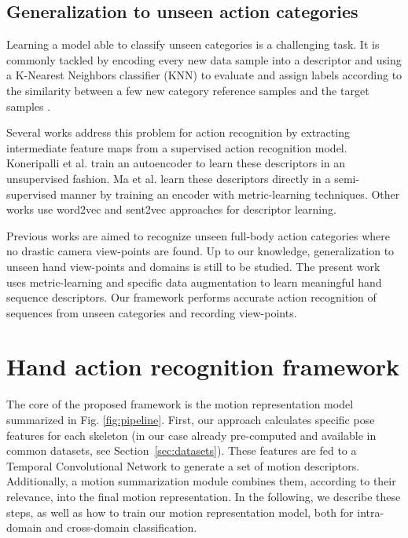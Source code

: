 \documentclass[letterpaper, 10 pt, conference]{ieeeconf}
\begin{document}
\subsection{Generalization to unseen action categories}

Learning a model able to classify unseen categories is a challenging task. It is commonly tackled by encoding every new data sample into a descriptor and using a K-Nearest Neighbors classifier (KNN) to evaluate and assign labels according to the similarity between a few new category reference samples and the target samples \cite{wang2019simpleshot}.


Several works \cite{liu2019ntu,sabater2021oneshot} address this problem for action recognition by extracting intermediate feature maps from a supervised action recognition model.
Koneripalli et al. \cite{koneripalli2020rate} train an autoencoder to learn these descriptors in an unsupervised fashion. Ma et al. 
\cite{ma2020skeleton} learn these descriptors directly in a semi-supervised manner by training an encoder with metric-learning techniques.
Other works use word2vec \cite{hahn2019action2vec} and sent2vec \cite{jasani2019skeleton} approaches for descriptor learning.

Previous works \cite{liu2019ntu,hahn2019action2vec,jasani2019skeleton} are aimed to recognize unseen full-body action categories where no drastic camera view-points are found. Up to our knowledge, generalization to unseen hand view-points and domains is still to be studied.
The present work uses metric-learning and specific data augmentation to learn meaningful hand sequence descriptors. Our framework performs accurate action recognition of sequences from unseen categories and recording view-points.




\section{Hand action recognition framework}

The core of the proposed framework is the motion representation model summarized in Fig. \ref{fig:pipeline}. 
First, our approach calculates specific pose features for each skeleton (in our case already pre-computed and available in common datasets, see Section~\ref{sec:datasets}). These features are fed to a Temporal Convolutional Network to generate a set of motion descriptors.
Additionally, a motion summarization module combines them, according to their relevance, into the final motion representation.
In the following, we describe these steps, as well as how to train our motion representation model, both for intra-domain and cross-domain classification. 
\end{document}
